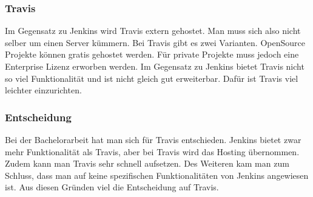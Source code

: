 \subsubsection{Travis}
Im Gegensatz zu Jenkins wird Travis extern gehostet. Man muss sich also nicht selber um einen Server kümmern. Bei Travis gibt es zwei Varianten. OpenSource Projekte können gratis gehostet werden. Für private Projekte muss jedoch eine Enterprise Lizenz erworben werden. Im Gegensatz zu Jenkins bietet Travis nicht so viel Funktionalität und ist nicht gleich gut erweiterbar. Dafür ist Travis viel leichter einzurichten.

\subsubsection*{Entscheidung}
Bei der Bachelorarbeit hat man sich für Travis entschieden. Jenkins bietet zwar mehr Funktionalität als Travis, aber bei Travis wird das Hosting übernommen. Zudem kann man Travis sehr schnell aufsetzen.
Des Weiteren kam man zum Schluss, dass man auf keine spezifischen Funktionalitäten von Jenkins angewiesen ist. Aus diesen Gründen viel die Entscheidung auf Travis.


\newpage